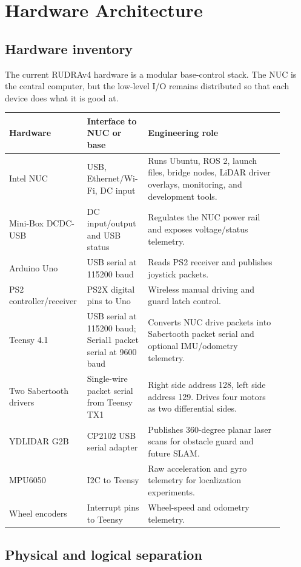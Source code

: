 \chapter{Hardware Architecture}

\section{Hardware inventory}

The current RUDRAv4 hardware is a modular base-control stack. The NUC is the central computer, but the low-level I/O remains distributed so that each device does what it is good at.

\begin{longtable}{p{0.22\linewidth}p{0.20\linewidth}p{0.48\linewidth}}
\toprule
Hardware & Interface to NUC or base & Engineering role\\
\midrule
Intel NUC & USB, Ethernet/Wi-Fi, DC input & Runs Ubuntu, ROS 2, launch files, bridge nodes, LiDAR driver overlays, monitoring, and development tools.\\
Mini-Box DCDC-USB & DC input/output and USB status & Regulates the NUC power rail and exposes voltage/status telemetry.\\
Arduino Uno & USB serial at 115200 baud & Reads PS2 receiver and publishes joystick packets.\\
PS2 controller/receiver & PS2X digital pins to Uno & Wireless manual driving and guard latch control.\\
Teensy 4.1 & USB serial at 115200 baud; Serial1 packet serial at 9600 baud & Converts NUC drive packets into Sabertooth packet serial and optional IMU/odometry telemetry.\\
Two Sabertooth drivers & Single-wire packet serial from Teensy TX1 & Right side address 128, left side address 129. Drives four motors as two differential sides.\\
YDLIDAR G2B & CP2102 USB serial adapter & Publishes 360-degree planar laser scans for obstacle guard and future SLAM.\\
MPU6050 & I2C to Teensy & Raw acceleration and gyro telemetry for localization experiments.\\
Wheel encoders & Interrupt pins to Teensy & Wheel-speed and odometry telemetry.\\
\bottomrule
\end{longtable}

\section{Physical and logical separation}

